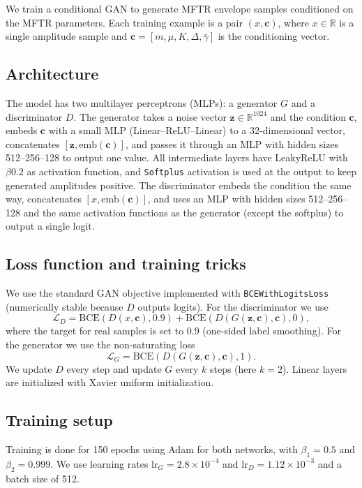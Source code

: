 We train a conditional GAN to generate MFTR envelope samples conditioned on the MFTR parameters. Each training example is a pair $(x,\mathbf{c})$, where $x\in\mathbb{R}$ is a single amplitude sample and $\mathbf{c}=[m,\mu,K,\Delta,\bar{\gamma}]$ is the conditioning vector.

\subsection{Architecture}
The model has two multilayer perceptrons (MLPs): a generator $G$ and a discriminator $D$.
The generator takes a noise vector $\mathbf{z}\in\mathbb{R}^{1024}$ and the condition $\mathbf{c}$, embeds $\mathbf{c}$ with a small MLP (Linear--ReLU--Linear) to a 32-dimensional vector, concatenates $[\mathbf{z},\mathrm{emb}(\mathbf{c})]$, and passes it through an MLP with hidden sizes 512--256--128 to output one value. All intermediate layers have LeakyReLU with $\beta 0.2$ as activation function, and \texttt{Softplus} activation is used at the output to keep generated amplitudes positive.
The discriminator embeds the condition the same way, concatenates $[x,\mathrm{emb}(\mathbf{c})]$, and uses an MLP with hidden sizes 512--256--128 and the same activation functions as the generator (except the softplus) to output a single logit.

\subsection{Loss function and training tricks}
We use the standard GAN objective implemented with \texttt{BCEWithLogitsLoss} (numerically stable because $D$ outputs logits).
For the discriminator we use
\begin{equation}
\mathcal{L}_D = \mathrm{BCE}(D(x,\mathbf{c}), 0.9) + \mathrm{BCE}(D(G(\mathbf{z},\mathbf{c}),\mathbf{c}), 0),
\end{equation}
where the target for real samples is set to 0.9 (one-sided label smoothing).
For the generator we use the non-saturating loss
\begin{equation}
\mathcal{L}_G = \mathrm{BCE}(D(G(\mathbf{z},\mathbf{c}),\mathbf{c}), 1).
\end{equation}
We update $D$ every step and update $G$ every $k$ steps (here $k=2$). Linear layers are initialized with Xavier uniform initialization.

\subsection{Training setup}
Training is done for 150 epochs using Adam for both networks, with $\beta_1=0.5$ and $\beta_2=0.999$.
We use learning rates $\mathrm{lr}_G=2.8\times 10^{-4}$ and $\mathrm{lr}_D=1.12\times 10^{-3}$ and a batch size of 512.

